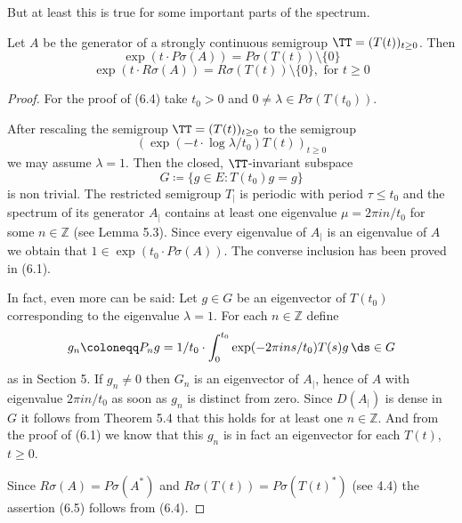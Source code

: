 But at least this is true for some important parts of the spectrum.
\begin{theorem}\label{thm:a3-6.3}

Let $A$ be the generator of a strongly continuous semigroup $\TT = (T(t))_{t \geq 0}$.
Then
\begin{equation}\label{eq:a3-6.4}
\exp(t \cdot P\sigma(A)) = P\sigma(T(t)) \setminus \{0\}
\end{equation}
\begin{equation}\label{eq:a3-6.5}
\exp(t \cdot R\sigma(A)) = R\sigma(T(t)) \setminus \{0\}, \text{ for } t \geq 0
\end{equation}
\end{theorem}

\begin{proof}
For the proof of (6.4) take $t_{0} > 0$ and $0 \neq \lambda \in P\sigma(T(t_{0}))$.

After rescaling the semigroup $\TT = (T(t))_{t \geq 0}$ to the semigroup 
\[
(\exp(-t \cdot \log\lambda/t_{0})T(t))_{t \geq 0}
\]
 we may assume $\lambda = 1$. Then the closed, $\TT$-invariant subspace
\[
G \coloneqq \{g \in E \colon T(t_{0})g = g\}
\]
is non trivial.
The restricted semigroup $T_{|}$ is periodic with period $\tau \leq t_{0}$ and the spectrum of its generator $A_{|}$ contains at least one eigenvalue $\mu = 2\pi in/t_{0}$ for some $n \in \mathbb{Z}$ (see Lemma 5.3).
Since every eigenvalue of $A_{|}$ is an eigenvalue of $A$ we obtain that $1 \in \exp(t_{0} \cdot P\sigma(A))$.
The converse inclusion has been proved in (6.1).

In fact, even more can be said: Let $g \in G$ be an eigenvector of $T(t_{0})$ corresponding to the eigenvalue $\lambda = 1$.
For each $n \in \mathbb{Z}$ define
\[
g_{n} \coloneqq P_{n}g = 1/t_{0} \cdot \int_{0}^{t_{0}} \exp(-2\pi ins/t_{0})T(s)g \, \ds \in G
\]
as in Section 5.
If $g_{n} \ne 0$ then $G_n$ is an eigenvector of $A_{|}$, hence of $A$ with eigenvalue $2\pi in/t_{0}$ as soon as $g_{n}$ is distinct from zero.
Since $D(A_{|})$ is dense in $G$ it follows from Theorem 5.4 that this holds for at least one $n \in \mathbb{Z}$.
And from the proof of (6.1) we know that this $g_{n}$ is in fact an eigenvector for each $T(t)$, $t \geq 0$.

Since $R\sigma(A) = P\sigma(A^*)$ and $R\sigma(T(t)) = P\sigma(T(t)^*)$ (see 4.4) the assertion (6.5) follows from (6.4).
\end{proof}

